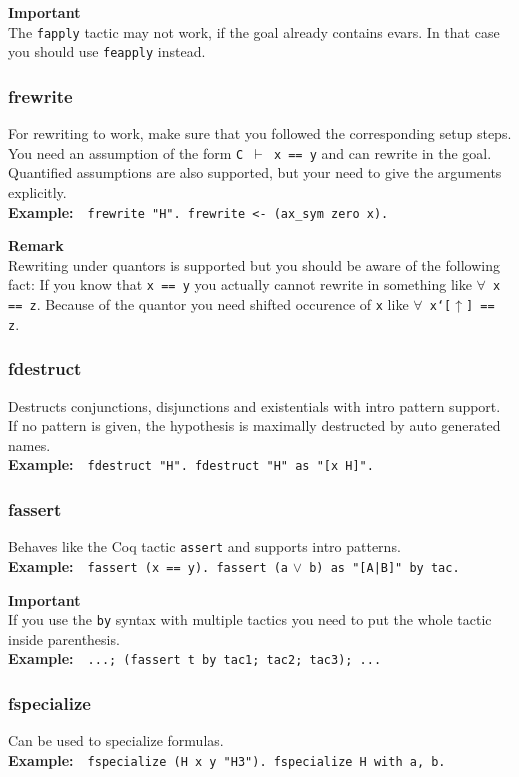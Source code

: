 \documentclass[12pt, a4paper]{article}
\newcommand{\coq}[1]{\texttt{#1}}
\newcommand{\important}[1]{
	\vspace{3pt}
	\begin{boximportant}
		\parbox{\textwidth}{\textcolor{colorimportant}{\textbf{Important}\\#1}}
	\end{boximportant}}
\newcommand{\remark}[1]{
	\vspace{3pt}
	\begin{boxremark}
		\parbox{\textwidth}{\textbf{Remark}\\#1}
	\end{boxremark}}
\newcommand{\example}[1]{\medskip\\\textbf{Example:}~~#1}
\begin{document}
\important{The \texttt{fapply} tactic may not work, if the goal already contains evars. In that case you should use \texttt{feapply} instead.}



\subsubsection{\ttfamily frewrite}

For rewriting to work, make sure that you followed the corresponding setup steps.
You need an assumption of the form \texttt{C $\vdash$ x == y} and can rewrite in the goal.
Quantified assumptions are also supported, but your need to give the arguments explicitly.
\example{\coq{frewrite "H". frewrite <- (ax_sym zero x).}}

\remark{Rewriting under quantors is supported but you should be aware of the following fact: If you know that \coq{x == y} you actually cannot rewrite in something like \texttt{$\forall$~\coq{x == z}}. Because of the quantor you need shifted occurence of \coq{x} like \texttt{$\forall$~\coq{x`[}$\uparrow$\coq{] == z}}.}


\subsubsection{\ttfamily fdestruct}

Destructs conjunctions, disjunctions and existentials with intro pattern support. 
If no pattern is given, the hypothesis is maximally destructed by auto generated names.
\example{\coq{fdestruct "H". fdestruct "H" as "[x H]".}}


\subsubsection{\ttfamily fassert}

Behaves like the Coq tactic \texttt{assert} and supports intro patterns.
\example{\coq{fassert (x == y). fassert (a} $\lor$\coq{ b) as "[A|B]" by tac.}}

\important{If you use the \texttt{by} syntax with multiple tactics you need to put the whole tactic inside parenthesis. \example{\texttt{...; (fassert t by tac1; tac2; tac3); ...}}}


\subsubsection{\ttfamily fspecialize}

Can be used to specialize formulas.
\example{\coq{fspecialize (H x y "H3"). fspecialize H with a, b.}}
\end{document}
